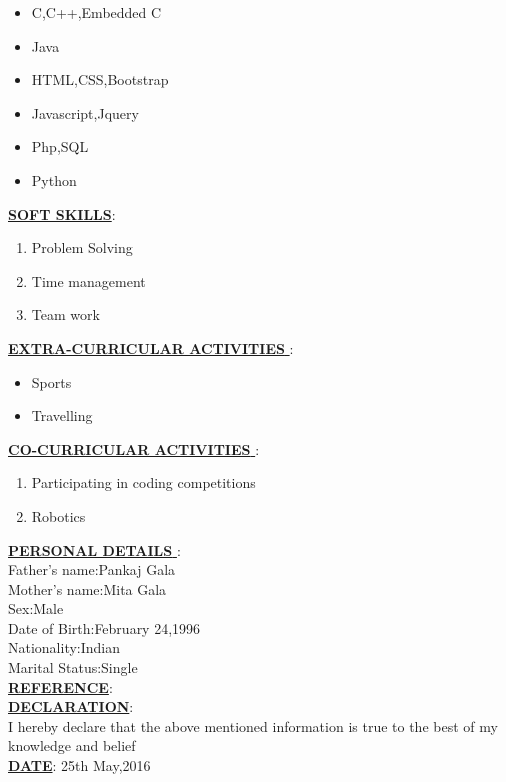 \documentclass[a4paper,12pt]{article}
\begin{document}
\begin{flushleft}
\begin{itemize}
 \item{C,C++,Embedded C}
 \item{Java}
 \item{HTML,CSS,Bootstrap}
 \item{Javascript,Jquery}
 \item{Php,SQL}
 \item{Python}
\end{itemize}
\underline{\textbf{SOFT SKILLS}}:\\[0.5cm]
\begin{enumerate}
 \item{Problem Solving}
 \item{Time management}
 \item{Team work}
\end{enumerate}
\underline{\textbf{EXTRA-CURRICULAR ACTIVITIES }}:\\[0.5cm]
\begin{itemize}
 \item{Sports}
 \item{Travelling}
\end{itemize}
\underline{\textbf{CO-CURRICULAR ACTIVITIES }}:\\[0.5cm]
\begin{enumerate}
 \item{Participating in coding competitions}
 \item{Robotics}
\end{enumerate}
\underline{\textbf{PERSONAL DETAILS }}:\\[0.5cm]
Father's name:Pankaj Gala\\
Mother's name:Mita Gala\\
Sex:Male\\
Date of Birth:February 24,1996\\
Nationality:Indian\\
Marital Status:Single\\[0.5cm]

\underline{\textbf{REFERENCE}}:\\[0.5cm]
\underline{\textbf{DECLARATION}}:\\[0.5cm]
I hereby declare that the above mentioned information is true to the best of my knowledge and belief\\[0.5cm]
\underline{\textbf{DATE}}: 25th May,2016

 \end{flushleft}
\end{document}
